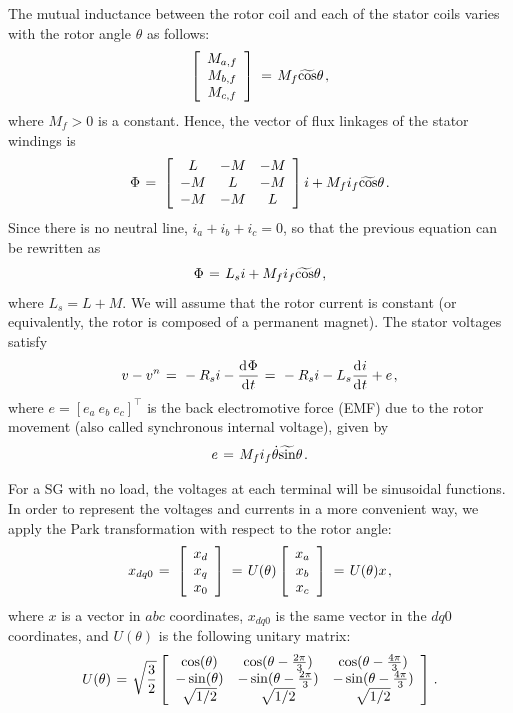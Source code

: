 \documentclass[letterpaper, 10 pt, conference]{ieeeconf}
\newcommand{\BE}{\begin{equation}}
\newcommand{\BEQ}[1]{\BE\label{#1}} %
\newcommand{\m}      {{\hbox{\hskip 1pt}}}
\newcommand{\dd}     {{\rm d\hbox{\hskip 0.5pt}}}
\begin{document}
The mutual inductance between the rotor coil and each of the stator
coils varies with the rotor angle $\theta$ as follows:
$$ \left[\begin{array}{c} M_{a,f}\\ M_{b,f}\\ M_{c,f}\end{array}
   \right] \m=\m M_{f}\widetilde{\cos}\theta \m,$$
where $M_f>0$ is a constant. Hence, the vector of flux linkages of the
stator windings is
$$ \Phi \m=\m \left[\begin{array}{ccc} L & -M & -M\\ -M & L & -M\\
   -M & -M & L \end{array}\right]i + M_f i_f\widetilde{\cos}\theta
   \m.$$
Since there is no neutral line, $i_a+i_b+i_c=0$, so that the previous
equation can be rewritten as 
$$\Phi \m=\m L_s i + M_f i_f \widetilde{\cos}\theta \m,$$
where $L_s=L+M$. We will assume that the rotor current is constant
(or equivalently, the rotor is composed of a permanent magnet). The
stator voltages satisfy
\BEQ{eq:SGTerminalVlotage}
   v - v^n \m=\m -R_{s}i-\frac{\dd\Phi}{\dd t} \m=\m -R_{s}i-L_{s}
   \frac{\dd i}{\dd t} + e \m,
\end{equation}
where $e=\left[e_a\ e_b\ e_c \right] ^\top$ is the back electromotive 
force (EMF) due to the rotor movement (also called synchronous 
internal voltage), given by \vspace{-2mm}
\BEQ{eq:emf}
   e \m=\m M_f i_f\dot{\theta}\widetilde{\sin}\theta \m.
\end{equation}

For a SG with no load, the voltages at each terminal
will be sinusoidal functions. In order to represent the voltages and
currents in a more convenient way, we apply the Park transformation
with respect to the rotor angle:
$$ x_{dq0} \m=\m \left[\begin{array}{c} x_{d}\\ x_{q}\\ x_{0}
   \end{array}\right] \m=\m U(\theta) \left[\begin{array}{c} x_{a}\\
   x_b\\ x_c\end{array}\right] \m=\m U(\theta) x \m,$$
where $x$ is a vector in $abc$ coordinates, $x_{dq0}$
is the same vector in the $dq0$ coordinates, and $U(\theta)$ is the
following unitary matrix:
$$ U(\theta) \m=\m \sqrt{\frac{3}{2}}\left[\begin{array}{ccc}
   \cos(\theta) & \cos(\theta-\frac{2\pi}{3}) & \cos(\theta-
   \frac{4\pi}{3})\\ -\sin(\theta) & -\sin(\theta-\frac{2\pi}{3})
   & -\sin(\theta-\frac{4\pi}{3})\\ \sqrt{1/2} & \sqrt{1/2} & 
   \sqrt{1/2} \end{array}\right] \m.$$
\end{document}
